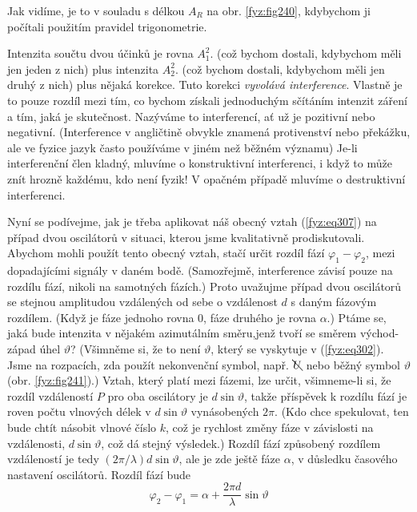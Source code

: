     Jak vidíme, je to v souladu s délkou \(A_R\) na obr. \ref{fyz:fig240}, kdybychom ji počítali 
    použitím pravidel trigonometrie. 
    
    Intenzita součtu dvou účinků je rovna \(A_1^2\). (což bychom dostali, kdybychom měli jen jeden 
    z nich) plus intenzita \(A_2^2\). (což bychom dostali, kdybychom měli jen druhý z nich) plus 
    nějaká korekce. Tuto korekci \emph{vyvolává interference}. Vlastně je to pouze rozdíl mezi tím, 
    co bychom získali jednoduchým sčítáním intenzit záření a tím, jaká je skutečnost. Nazýváme to 
    interferencí, ať už je pozitivní nebo negativní. (Interference v angličtině obvykle znamená 
    protivenství nebo překážku, ale ve fyzice jazyk často používáme v jiném než běžném významu) 
    Je-li interferenční člen kladný, mluvíme o konstruktivní interferenci, i když to může znít 
    hrozně každému, kdo není fyzik! V opačném případě mluvíme o destruktivní interferenci. 
    
    Nyní se podívejme, jak je třeba aplikovat náš obecný vztah (\ref{fyz:eq307}) na případ dvou 
    oscilátorů v situaci, kterou jsme kvalitativně prodiskutovali. Abychom mohli použít tento 
    obecný vztah, stačí určit rozdíl fází \(\varphi_1-\varphi_2\), mezi dopadajícími signály v 
    daném bodě. (Samozřejmě, interference závisí pouze na rozdílu fází, nikoli na samotných 
    fázích.) Proto uvažujme případ dvou oscilátorů se stejnou amplitudou vzdálených od sebe o 
    vzdálenost \(d\) s daným fázovým rozdílem. (Když je fáze jednoho rovna \(0\), fáze druhého je 
    rovna \(\alpha\).) Ptáme se, jaká bude intenzita v nějakém azimutálním směru,jenž tvoří se 
    směrem východ-západ úhel \(\vartheta\)? (Všimněme si, že to není \(\vartheta\), který se 
    vyskytuje v (\ref{fyz:eq302}). Jsme na rozpacích, zda použít nekonvenční symbol, např. 
    \(\bcancel{U}\) nebo běžný symbol \(\vartheta\) (obr. \ref{fyz:fig241}).) Vztah, který platí 
    mezi fázemi, lze určit, všimneme-li si, že rozdíl vzdáleností \(P\) pro oba oscilátory je 
    \(d\sin\vartheta\), takže příspěvek k rozdílu fází je roven počtu vlnových délek v 
    \(d\sin\vartheta\) vynásobených \(2\pi\). (Kdo chce spekulovat, ten bude chtít násobit vlnové 
    číslo \(k\), což je rychlost změny fáze v závislosti na vzdálenosti, \(d\sin\vartheta\), což dá 
    stejný výsledek.) Rozdíl fází způsobený rozdílem vzdáleností je tedy 
    \((2\pi/\lambda)d\sin\vartheta\), ale je zde ještě fáze \(\alpha\), v důsledku časového 
    nastavení oscilátorů. Rozdíl fází bude
    \begin{equation}\label{fyz:eq315}
      \varphi_2-\varphi_1 = \alpha  + \frac{2\pi d}{\lambda}\sin\vartheta
    \end{equation}
    
